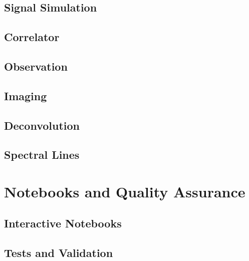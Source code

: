 	\chapter{Signal Simulation}
	

	\chapter{Correlator}
	

	\chapter{Observation}
	

	\chapter{Imaging}
	

	\chapter{Deconvolution}
	

	\chapter{Spectral Lines}
	

\part{Notebooks and Quality Assurance}

	\chapter{Interactive Notebooks}
	

	\chapter{Tests and Validation}
	

